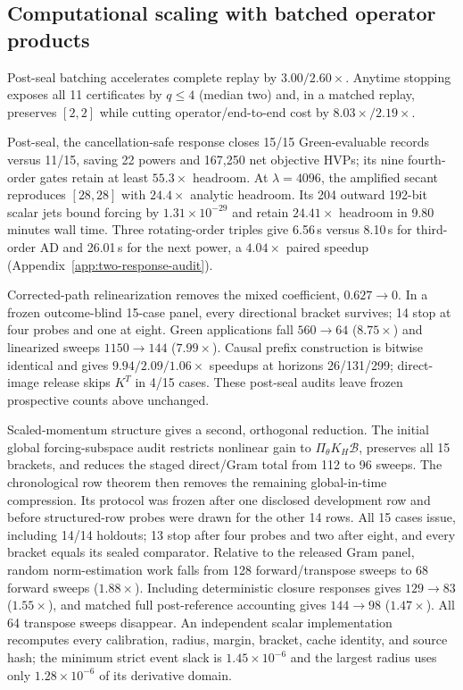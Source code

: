 \documentclass{article}
\begin{document}
\subsection{Computational scaling with batched operator products}

Post-seal batching accelerates complete replay by $3.00/2.60\times$.  Anytime
stopping exposes all 11 certificates by $q\le4$ (median two) and, in a matched
replay, preserves $[2,2]$ while cutting operator/end-to-end cost by
$8.03\times/2.19\times$.

Post-seal, the cancellation-safe response closes 15/15 Green-evaluable records
versus 11/15, saving 22 powers and 167,250 net objective HVPs; its nine
fourth-order gates retain at least $55.3\times$ headroom.  At $\lambda=4096$,
the amplified secant reproduces $[28,28]$ with $24.4\times$ analytic headroom.
Its 204 outward 192-bit scalar jets bound forcing by $1.31\times10^{-29}$ and
retain $24.41\times$ headroom in 9.80 minutes wall time.  Three rotating-order
triples give 6.56\,s versus 8.10\,s for third-order AD and 26.01\,s for the
next power, a $4.04\times$ paired speedup (Appendix~\ref{app:two-response-audit}).

Corrected-path relinearization removes the mixed coefficient, $0.627\to0$.
In a frozen outcome-blind 15-case panel, every directional bracket survives;
14 stop at four probes and one at eight.  Green applications fall $560\to64$
($8.75\times$) and linearized sweeps $1150\to144$ ($7.99\times$).  Causal
prefix construction is bitwise identical and gives
$9.94/2.09/1.06\times$ speedups at horizons 26/131/299; direct-image release
skips $K^T$ in 4/15 cases.  These post-seal audits leave frozen prospective
counts above unchanged.

Scaled-momentum structure gives a second, orthogonal reduction.  The initial
global forcing-subspace audit restricts nonlinear gain to
$\Pi_\theta K_H\mathcal B$, preserves all 15 brackets, and reduces the staged
direct/Gram total from 112 to 96 sweeps.  The chronological row theorem then
removes the remaining global-in-time compression.  Its protocol was frozen
after one disclosed development row and before structured-row probes were
drawn for the other 14 rows.  All 15 cases issue, including 14/14 holdouts; 13
stop after four probes and two after eight, and every bracket equals its sealed
comparator.  Relative to the released Gram panel, random norm-estimation work
falls from 128 forward/transpose sweeps to 68 forward sweeps
($1.88\times$).  Including deterministic closure responses gives
$129\to83$ ($1.55\times$), and matched full post-reference accounting gives
$144\to98$ ($1.47\times$).  All 64 transpose sweeps disappear.  An independent
scalar implementation recomputes every calibration, radius, margin, bracket,
cache identity, and source hash; the minimum strict event slack is
$1.45\times10^{-6}$ and the largest radius uses only
$1.28\times10^{-6}$ of its derivative domain.
\end{document}
